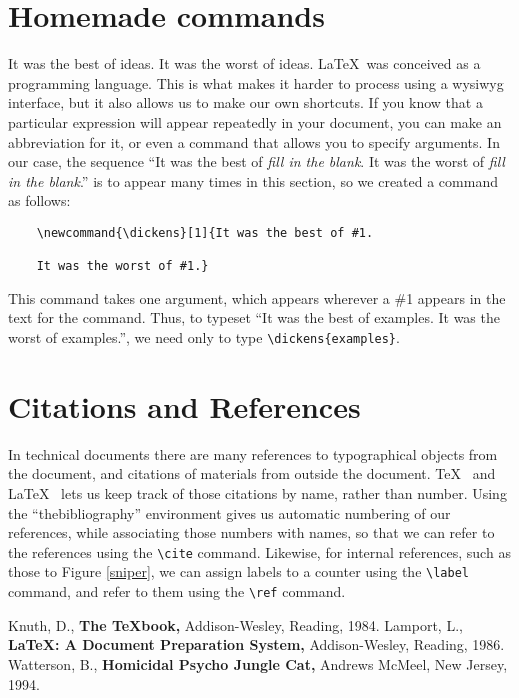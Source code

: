 \documentclass[12pt]{article}
\begin{document}
\section{Homemade commands}
\newcommand{\dickens}[1]{It was the best of #1. It was the worst of #1.}
\dickens{ideas}
\LaTeX\ was conceived as a programming language.
This is what makes it
harder to process using a wysiwyg interface, but it also allows
us to make our own shortcuts.
If you know that a particular expression will appear repeatedly
in your document, you can make an abbreviation for it, or even
a command that allows you to specify arguments.
In our case,
the sequence ``\dickens{{\it fill in the blank}}''
is to appear many times in this section, so we created a command
as follows:
\begin{verbatim}
    \newcommand{\dickens}[1]{It was the best of #1.

    It was the worst of #1.}
\end{verbatim}
This command takes one argument, which appears wherever a \#1 appears
in the text for the command.
Thus, to typeset ``\dickens{examples}'',
we need only to type \verb(\dickens{examples}(.

\section{Citations and References}
In technical documents there are many references to 
typographical objects from the document, and citations
of materials from outside the document.
\TeX\ \cite{knuth}
and \LaTeX\ \cite{lamport} lets us keep track of those citations
by name, rather than number.
Using the ``thebibliography'' 
environment gives us automatic numbering of our references,
while associating those numbers with names, so that we can
refer to the references using the \verb(\cite( command.
Likewise, for internal references, such as those to Figure \ref{sniper},
we can assign labels to a counter using the \verb(\label(
command, and refer to them using the \verb(\ref( command.

\begin{thebibliography}{X}
     Knuth, D., {\bf The \TeX book,} Addison-Wesley, Reading, 1984.
     Lamport, L., {\bf \LaTeX: A Document Preparation System,}
    Addison-Wesley, Reading, 1986.
     Watterson, B., {\bf Homicidal Psycho Jungle Cat,}
    Andrews McMeel, New Jersey, 1994.
\end{thebibliography}
\end{document}
